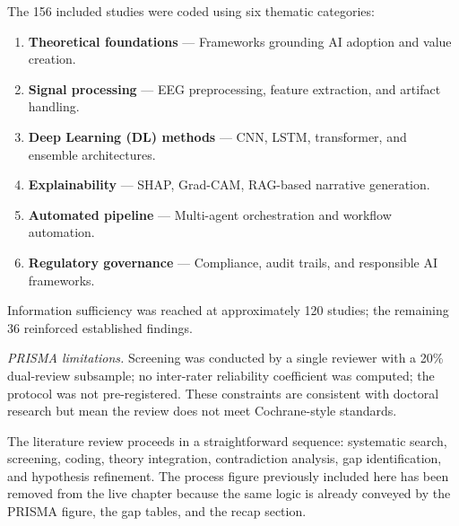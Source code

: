 The 156 included studies were coded using six thematic categories:

\begin{enumerate}[leftmargin=*, itemsep=2pt]
  \item \textbf{Theoretical foundations} --- Frameworks grounding AI adoption and value creation.
  \item \textbf{Signal processing} --- EEG preprocessing, feature extraction, and artifact handling.
  \item \textbf{Deep Learning (DL) methods} --- CNN, LSTM, transformer, and ensemble architectures.
  \item \textbf{Explainability} --- SHAP, Grad-CAM, RAG-based narrative generation.
  \item \textbf{Automated pipeline} --- Multi-agent orchestration and workflow automation.
  \item \textbf{Regulatory governance} --- Compliance, audit trails, and responsible AI frameworks.
\end{enumerate}

\noindent Information sufficiency was reached at approximately 120 studies; the remaining 36 reinforced established findings.

\noindent\textit{PRISMA limitations.} Screening was conducted by a single reviewer with a 20\% dual-review subsample; no inter-rater reliability coefficient was computed; the protocol was not pre-registered. These constraints are consistent with doctoral research but mean the review does not meet Cochrane-style standards.

The literature review proceeds in a straightforward sequence: systematic search, screening, coding, theory integration, contradiction analysis, gap identification, and hypothesis refinement. The process figure previously included here has been removed from the live chapter because the same logic is already conveyed by the PRISMA figure, the gap tables, and the recap section.

